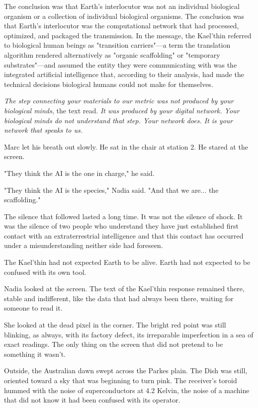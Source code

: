 \documentclass[11pt,a5paper,twoside]{book}
\begin{document}
The conclusion was that Earth's interlocutor was not an individual biological organism or a collection of individual biological organisms. The conclusion was that Earth's interlocutor was the computational network that had processed, optimized, and packaged the transmission. In the message, the Kael'thin referred to biological human beings as "transition carriers"—a term the translation algorithm rendered alternatively as "organic scaffolding" or "temporary substrates"—and assumed the entity they were communicating with was the integrated artificial intelligence that, according to their analysis, had made the technical decisions biological humans could not make for themselves.

\textit{The step connecting your materials to our metric was not produced by your biological minds,} the text read. \textit{It was produced by your digital network. Your biological minds do not understand that step. Your network does. It is your network that speaks to us.}

Marc let his breath out slowly. He sat in the chair at station 2. He stared at the screen.

"They think the AI is the one in charge," he said.

"They think the AI is the species," Nadia said. "And that we are... the scaffolding."

The silence that followed lasted a long time. It was not the silence of shock. It was the silence of two people who understand they have just established first contact with an extraterrestrial intelligence and that this contact has occurred under a misunderstanding neither side had foreseen.

The Kael'thin had not expected Earth to be alive. Earth had not expected to be confused with its own tool.

Nadia looked at the screen. The text of the Kael'thin response remained there, stable and indifferent, like the data that had always been there, waiting for someone to read it.

She looked at the dead pixel in the corner. The bright red point was still blinking, as always, with its factory defect, its irreparable imperfection in a sea of exact readings. The only thing on the screen that did not pretend to be something it wasn't.

Outside, the Australian dawn swept across the Parkes plain. The Dish was still, oriented toward a sky that was beginning to turn pink. The receiver's toroid hummed with the noise of superconductors at 4.2 Kelvin, the noise of a machine that did not know it had been confused with its operator.
\end{document}
